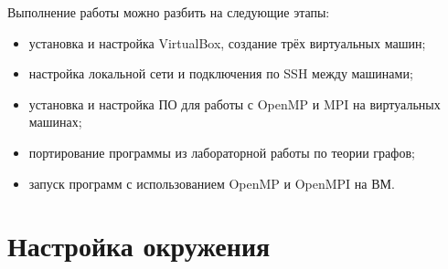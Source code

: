 \documentclass[11pt,a4paper,final]{article}
\begin{document}
Выполнение работы можно разбить на следующие этапы:
\begin{itemize}
	\item установка и настройка VirtualBox, создание трёх виртуальных машин;
	\item настройка локальной сети и подключения по SSH между машинами;
	\item установка и настройка ПО для работы с OpenMP и MPI на виртуальных машинах;
	\item портирование программы из лабораторной работы по теории графов;
	\item запуск программ с использованием OpenMP и OpenMPI на ВМ.
\end{itemize}

\newpage
\section{Настройка окружения}
\end{document}
